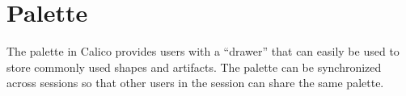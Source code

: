 

\section{Palette}
The palette in Calico provides users with a ``drawer'' that can easily be used to store commonly used shapes and artifacts.
The palette can be synchronized across sessions so that other users in the session can share the same palette.